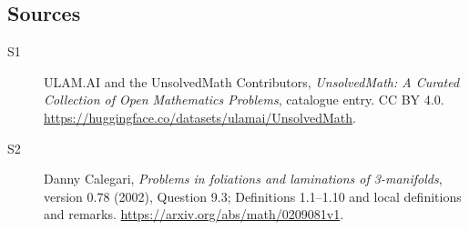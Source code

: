 \documentclass[11pt]{article}
\begin{document}
\subsection{Sources}
\begin{description}
\item[\hypertarget{source:statement:1}{S1}] ULAM.AI and the UnsolvedMath Contributors, \emph{UnsolvedMath: A Curated Collection of Open Mathematics Problems}, catalogue entry. CC BY 4.0. \url{https://huggingface.co/datasets/ulamai/UnsolvedMath}.
\item[\hypertarget{source:statement:2}{S2}] Danny Calegari, \emph{Problems in foliations and laminations of 3-manifolds}, version 0.78 (2002), Question 9.3; Definitions 1.1--1.10 and local definitions and remarks. \url{https://arxiv.org/abs/math/0209081v1}.
\end{description}
\label{end:statement}
\end{document}
